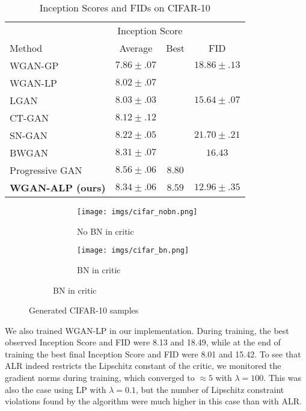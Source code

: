 \documentclass{article}
\begin{document}
\begin{table}[h]
  \caption{Inception Scores and FIDs on CIFAR-10}
  \label{inception_scores}
  \centering
  \begin{tabular}{lccc}
    \toprule
    &\multicolumn{2}{c}{Inception Score}&\\
    \cmidrule(r){2-3}
    Method & Average & Best & FID\\
    \midrule
    WGAN-GP             & $7.86 \pm .07$ &        & $18.86 \pm .13$ \\
    WGAN-LP             & $8.02 \pm .07$ &        &                 \\
    LGAN                & $8.03 \pm .03$ &        & $15.64 \pm .07$ \\
    CT-GAN              & $8.12 \pm .12$ &        &                 \\
    SN-GAN              & $8.22 \pm .05$ &        & $21.70 \pm .21$ \\
    BWGAN               & $8.31 \pm .07$ &        & $16.43$         \\
    Progressive GAN     & $8.56 \pm .06$ & $8.80$ &                 \\
    \textbf{WGAN-ALP (ours)} & $\mathbf{8.34 \pm .06}$ & $\mathbf{8.59}$ & $\mathbf{12.96 \pm .35}$  \\
    \bottomrule
  \end{tabular}
\end{table}

\begin{figure}[h]
\begin{subfigure}{\linewidth}
  \centering
  \begin{subfigure}{.495\linewidth}
  \texttt{[image: imgs/cifar\_nobn.png]}
  \caption{No BN in critic}
  \label{cifar_samples_nobn}
  \end{subfigure}\hfill
  \begin{subfigure}{.495\linewidth}
  \texttt{[image: imgs/cifar\_bn.png]}
  \caption{BN in critic}
  \label{cifar_samples_bn}
  \end{subfigure}
\end{subfigure}
  \caption{Generated CIFAR-10 samples}
  \label{cifar_samples}
\end{figure}

We also trained WGAN-LP in our implementation. During training, the best observed Inception Score and FID were 8.13 and 18.49, while at the end of training the best final Inception Score and FID were 8.01 and 15.42. To see that ALR indeed restricts the Lipschitz constant of the critic, we monitored the gradient norms during training, which converged to $\approx 5$ with $\lambda=100$. This was also the case using LP with $\lambda=0.1$, but the number of Lipschitz constraint violations found by the algorithm were much higher in this case than with ALR.
\end{document}

